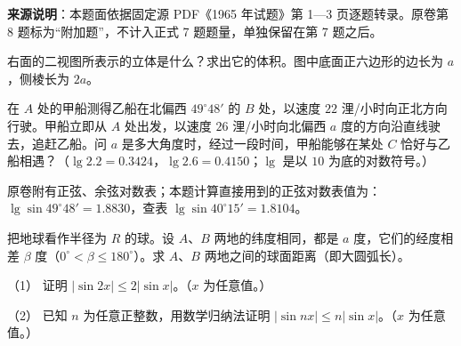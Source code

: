 

\begin{gktip}
\textbf{来源说明}：本题面依据固定源 PDF《1965 年试题》第 1—3 页逐题转录。原卷第 8 题标为“附加题”，不计入正式 7 题题量，单独保留在第 7 题之后。
\end{gktip}

\par\medskip

\Needspace{0.4\textheight}
\begin{question}
右面的二视图所表示的立体是什么？求出它的体积。图中底面正六边形的边长为 $a$，侧棱长为 $2a$。
\nopagebreak[4]
\begin{center}\end{center}
\nopagebreak[4]
\Needspace{0.4\textheight}
\end{question}
\begin{question}
在 $A$ 处的甲船测得乙船在北偏西 $49^\circ48'$ 的 $B$ 处，以速度 $22$ 浬/小时向正北方向行驶。甲船立即从 $A$ 处出发，以速度 $26$ 浬/小时向北偏西 $a$ 度的方向沿直线驶去，追赶乙船。问 $a$ 是多大角度时，经过一段时间，甲船能够在某处 $C$ 恰好与乙船相遇？（$\lg2.2=0.3424$，$\lg2.6=0.4150$；$\lg$ 是以 $10$ 为底的对数符号。）
\nopagebreak[4]
\begin{center}\end{center}
\nopagebreak[4]
\begin{gktip}
原卷附有正弦、余弦对数表；本题计算直接用到的正弦对数表值为：$\lg\sin49^\circ48'=1.8830$，查表 $\lg\sin40^\circ15'=1.8104$。
\end{gktip}

\Needspace{0.4\textheight}
\end{question}
\begin{question}
把地球看作半径为 $R$ 的球。设 $A$、$B$ 两地的纬度相同，都是 $a$ 度，它们的经度相差 $\beta$ 度（$0^\circ<\beta\leqslant180^\circ$）。求 $A$、$B$ 两地之间的球面距离（即大圆弧长）。
\nopagebreak[4]
\begin{center}\end{center}
\nopagebreak[4]
\end{question}
\begin{question}

（1） 证明 $|\sin2x|\leqslant2|\sin x|$。（$x$ 为任意值。）

（2） 已知 $n$ 为任意正整数，用数学归纳法证明 $|\sin nx|\leqslant n|\sin x|$。（$x$ 为任意值。）

\Needspace{0.4\textheight}
\end{question}
